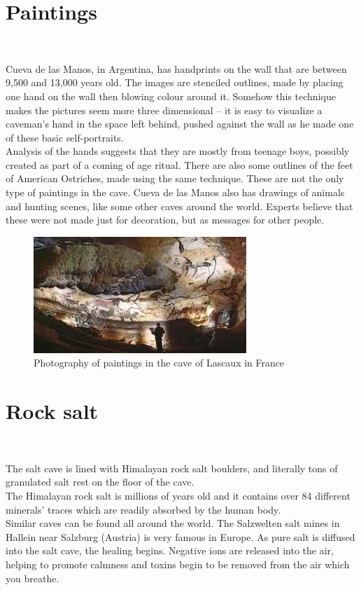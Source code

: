 \documentclass[draft, final]{report}
\begin{document}
\section{Paintings}
~\par
Cueva de las Manos, in Argentina, has handprints on the wall that are between 9,500 and 13,000 years old. The images are stenciled outlines, made by placing one hand on the wall then blowing colour around it. Somehow this technique makes the pictures seem more three dimensional – it is easy to visualize a caveman’s hand in the space left behind, pushed against the wall as he made one of these basic self-portraits.\\
Analysis of the hands suggests that they are mostly from teenage boys, possibly created as part of a coming of age ritual. There are also some outlines of the feet of American Ostriches, made using the same technique. These are not the only type of paintings in the cave. Cueva de las Manos also has drawings of animals and hunting scenes, like some other caves around the world. Experts believe that these were not made just for decoration, but as messages for other people.
\begin{figure}[!ht]
  \centering
  \includegraphics[scale=1]{LateX/Images/paintings.jpg}
  \caption{Photography of paintings in the cave of Lascaux in France\cite{cavepaintings}}
\end{figure}
\clearpage
\section{Rock salt}
~\par

The salt cave is lined with Himalayan rock salt boulders, and literally tons of granulated salt rest on the floor of the cave.\\

The Himalayan rock salt is millions of years old and it contains over 84 different minerals' traces which are readily absorbed by the human body.\\
Similar caves can be found all around the world. The Salzwelten salt mines in Hallein near Salzburg (Austria) is very famous in Europe.
As pure salt is diffused into the salt cave, the healing begins. Negative ions are released into the air, helping to promote calmness and toxins begin to be removed from the air which you breathe.\\
\end{document}
